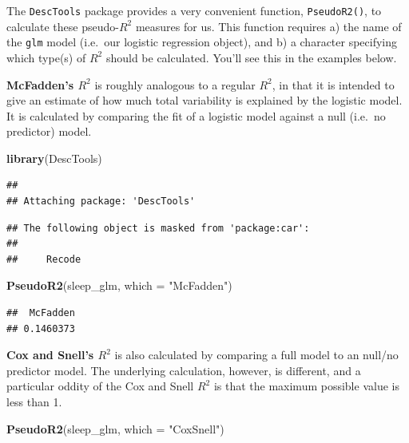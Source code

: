 \documentclass[
]{book}
\newenvironment{Shaded}{\begin{snugshade}}{\end{snugshade}}
\newcommand{\AttributeTok}[1]{\textcolor[rgb]{0.13,0.29,0.53}{#1}}
\newcommand{\FunctionTok}[1]{\textcolor[rgb]{0.13,0.29,0.53}{\textbf{#1}}}
\newcommand{\NormalTok}[1]{#1}
\newcommand{\StringTok}[1]{\textcolor[rgb]{0.31,0.60,0.02}{#1}}
\begin{document}
The \texttt{DescTools} package provides a very convenient function, \texttt{PseudoR2()}, to calculate these pseudo-\(R^2\) measures for us. This function requires a) the name of the \texttt{glm} model (i.e.~our logistic regression object), and b) a character specifying which type(s) of \(R^2\) should be calculated. You'll see this in the examples below.

\textbf{McFadden's \(R^2\)} is roughly analogous to a regular \(R^2\), in that it is intended to give an estimate of how much total variability is explained by the logistic model. It is calculated by comparing the fit of a logistic model against a null (i.e.~no predictor) model.

\begin{Shaded}
\begin{Highlighting}[]
\FunctionTok{library}\NormalTok{(DescTools)}
\end{Highlighting}
\end{Shaded}

\begin{verbatim}
## 
## Attaching package: 'DescTools'
\end{verbatim}

\begin{verbatim}
## The following object is masked from 'package:car':
## 
##     Recode
\end{verbatim}

\begin{Shaded}
\begin{Highlighting}[]
\FunctionTok{PseudoR2}\NormalTok{(sleep\_glm, }\AttributeTok{which =} \StringTok{"McFadden"}\NormalTok{)}
\end{Highlighting}
\end{Shaded}

\begin{verbatim}
##  McFadden 
## 0.1460373
\end{verbatim}

\textbf{Cox and Snell's \(R^2\)} is also calculated by comparing a full model to an null/no predictor model. The underlying calculation, however, is different, and a particular oddity of the Cox and Snell \(R^2\) is that the maximum possible value is less than 1.

\begin{Shaded}
\begin{Highlighting}[]
\FunctionTok{PseudoR2}\NormalTok{(sleep\_glm, }\AttributeTok{which =} \StringTok{"CoxSnell"}\NormalTok{)}
\end{Highlighting}
\end{Shaded}
\end{document}
